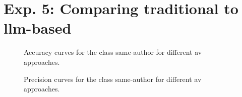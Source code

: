 \section{Exp. 5: Comparing traditional to \ac{llm}-based \imps{}}

\begin{figure}[htbp]
  \centering
    
  \caption{Accuracy curves for the class same-author for different \ac{av} approaches.}
  \label{fig:comp_av_acc}
\end{figure}


\begin{figure}[htbp]
  \centering
    
  \caption{Precision curves for the class same-author for different \ac{av} approaches.}
  \label{fig:comp_av_prec}
\end{figure}
